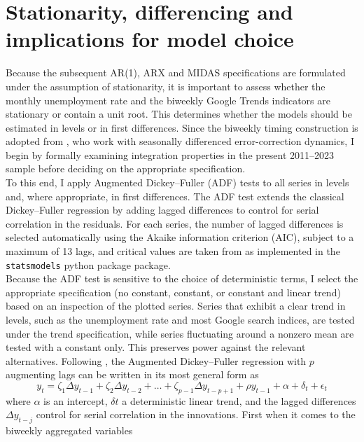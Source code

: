 \documentclass[12pt,a4paper]{article}
\begin{document}
\section{Stationarity, differencing and implications for model choice}
Because the subsequent AR(1), ARX and MIDAS specifications are formulated under the assumption of stationarity, it is important to assess whether the monthly unemployment rate and the biweekly Google Trends indicators are stationary or contain a unit root. This determines whether the models should be estimated in levels or in first differences. 
Since the biweekly timing construction is adopted from \citet{Askitas}, who work with seasonally differenced error-correction dynamics, I begin by formally examining integration properties in the present 2011–2023 sample before deciding on the appropriate specification.\\
To this end, I apply Augmented Dickey--Fuller (ADF) tests to all series in levels and, where appropriate, in first differences. The ADF test extends the classical Dickey--Fuller regression by adding lagged differences to control for serial correlation in the residuals. For each series, the number of lagged differences is selected automatically using the Akaike information criterion (AIC), subject to a maximum of 13 lags, and critical values are taken from \citet{mckinnon} as implemented in the \texttt{statsmodels} python package package.\\
Because the ADF test is sensitive to the choice of deterministic terms, I select the appropriate specification (no constant, constant, or constant and linear trend) based on an inspection of the plotted series. Series that exhibit a clear trend in levels, such as the unemployment rate and most Google search indices, are tested under the trend specification, while series fluctuating around a nonzero mean are tested with a constant only. This preserves power against the relevant alternatives.
Following \citet[Table~17.3]{hamilton}, the Augmented Dickey--Fuller regression with $p$ augmenting lags can be written in its most general form as
\begin{equation}
y_t = \zeta_1 \Delta y_{t-1} + \zeta_2 \Delta y_{t-2} + \dots + \zeta_{p-1} \Delta y_{t-p+1} + \rho y_{t-1}+ \alpha + \delta_t + \epsilon_t
\label{eq:adf}
\end{equation}
where $\alpha$ is an intercept, $\delta t$ a deterministic linear trend, and the lagged differences $\Delta y_{t-j}$ control for serial correlation in the innovations.
First when it comes to the biweekly aggregated variables
\end{document}
